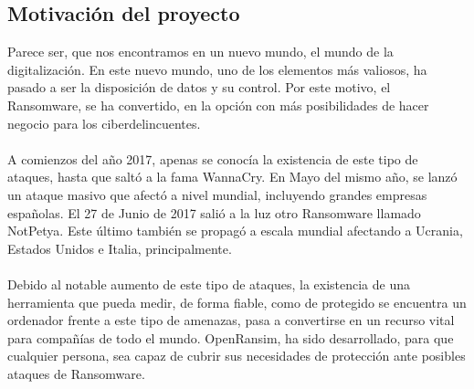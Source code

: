 \documentclass[a4paper,12pt]{article}
\begin{document}
\subsection{Motivación del proyecto}
Parece ser, que nos encontramos en un nuevo mundo, el mundo de la digitalización. En este nuevo mundo, uno de los elementos más valiosos, ha pasado a ser la disposición de datos y su control. Por este motivo, el Ransomware, se ha convertido, en la opción con más posibilidades de hacer negocio para los ciberdelincuentes.\\\\
A comienzos del año 2017, apenas se conocía la existencia de este tipo de ataques, hasta que saltó a la fama WannaCry. En Mayo del mismo año, se lanzó un ataque masivo que afectó a nivel mundial, incluyendo grandes empresas españolas. El 27 de Junio de 2017 salió a la luz otro Ransomware llamado NotPetya. Este último también se propagó a escala mundial afectando a Ucrania, Estados Unidos e Italia, principalmente.\\\\
Debido al notable aumento de este tipo de ataques, la existencia de una herramienta que pueda medir, de forma fiable, como de protegido se encuentra un ordenador frente a este tipo de amenazas, pasa a convertirse en un recurso vital para compañías de todo el mundo. 
OpenRansim, ha sido desarrollado, para que cualquier persona, sea capaz de cubrir sus necesidades de protección ante posibles ataques de Ransomware. 
\end{document}
